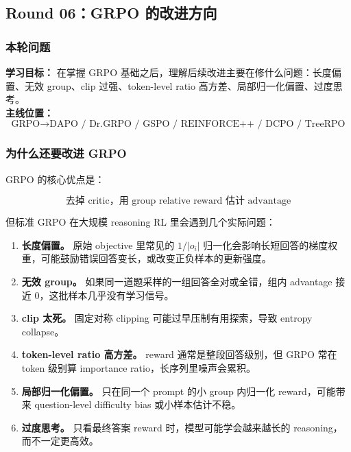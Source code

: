 
\subsection{Round 06：GRPO 的改进方向}

\subsubsection{本轮问题}

\begin{conceptbox}
\textbf{学习目标：} 在掌握 GRPO 基础之后，理解后续改进主要在修什么问题：长度偏置、无效 group、clip 过强、token-level ratio 高方差、局部归一化偏置、过度思考。\\
\textbf{主线位置：}
\[
\text{GRPO}
\to
\text{DAPO / Dr.GRPO / GSPO / REINFORCE++ / DCPO / TreeRPO}
\]
\end{conceptbox}

\subsubsection{为什么还要改进 GRPO}

GRPO 的核心优点是：

\[
\text{去掉 critic，用 group relative reward 估计 advantage}
\]

但标准 GRPO 在大规模 reasoning RL 里会遇到几个实际问题：

\begin{enumerate}[leftmargin=1.5em]
  \item \textbf{长度偏置。} 原始 objective 里常见的 $1/|o_i|$ 归一化会影响长短回答的梯度权重，可能鼓励错误回答变长，或改变正负样本的更新强度。
  \item \textbf{无效 group。} 如果同一道题采样的一组回答全对或全错，组内 advantage 接近 $0$，这批样本几乎没有学习信号。
  \item \textbf{clip 太死。} 固定对称 clipping 可能过早压制有用探索，导致 entropy collapse。
  \item \textbf{token-level ratio 高方差。} reward 通常是整段回答级别，但 GRPO 常在 token 级别算 importance ratio，长序列里噪声会累积。
  \item \textbf{局部归一化偏置。} 只在同一个 prompt 的小 group 内归一化 reward，可能带来 question-level difficulty bias 或小样本估计不稳。
  \item \textbf{过度思考。} 只看最终答案 reward 时，模型可能学会越来越长的 reasoning，而不一定更高效。
\end{enumerate}


